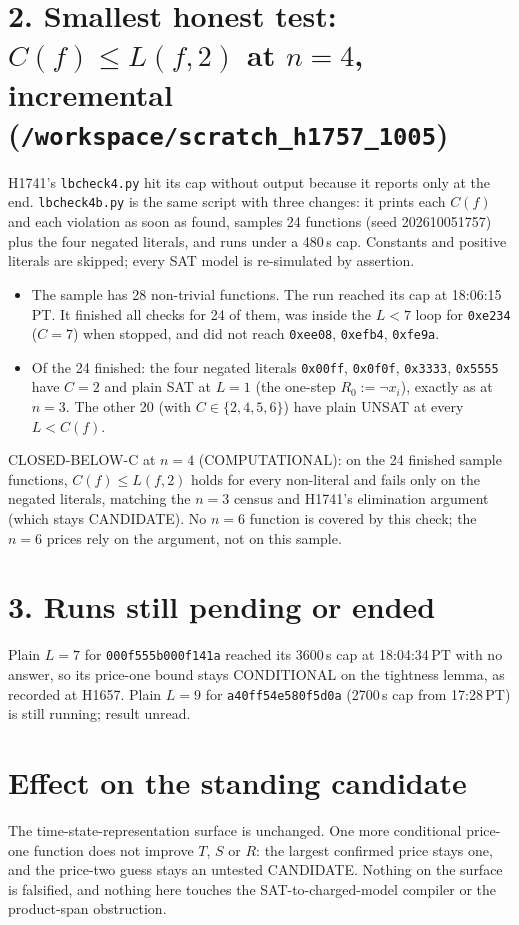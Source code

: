 \documentclass[11pt]{article}
\begin{document}
\section*{2. Smallest honest test: $C(f)\le L(f,2)$ at $n=4$, incremental (\texttt{/workspace/scratch\_h1757\_1005})}
H1741's \texttt{lbcheck4.py} hit its cap without output because it reports only at the end. \texttt{lbcheck4b.py} is the same script with three changes: it prints each $C(f)$ and each violation as soon as found, samples 24 functions (seed 202610051757) plus the four negated literals, and runs under a 480\,s cap. Constants and positive literals are skipped; every SAT model is re-simulated by assertion.
\begin{itemize}
\item The sample has 28 non-trivial functions. The run reached its cap at 18:06:15\,PT. It finished all checks for 24 of them, was inside the $L<7$ loop for \texttt{0xe234} ($C=7$) when stopped, and did not reach \texttt{0xee08}, \texttt{0xefb4}, \texttt{0xfe9a}.
\item Of the 24 finished: the four negated literals \texttt{0x00ff}, \texttt{0x0f0f}, \texttt{0x3333}, \texttt{0x5555} have $C=2$ and plain SAT at $L=1$ (the one-step $R_0:=\lnot x_i$), exactly as at $n=3$. The other 20 (with $C\in\{2,4,5,6\}$) have plain UNSAT at every $L<C(f)$.
\end{itemize}
CLOSED-BELOW-C at $n=4$ (COMPUTATIONAL): on the 24 finished sample functions, $C(f)\le L(f,2)$ holds for every non-literal and fails only on the negated literals, matching the $n=3$ census and H1741's elimination argument (which stays CANDIDATE). No $n=6$ function is covered by this check; the $n=6$ prices rely on the argument, not on this sample.

\section*{3. Runs still pending or ended}
Plain $L=7$ for \texttt{000f555b000f141a} reached its 3600\,s cap at 18:04:34\,PT with no answer, so its price-one bound stays CONDITIONAL on the tightness lemma, as recorded at H1657. Plain $L=9$ for \texttt{a40ff54e580f5d0a} (2700\,s cap from 17:28\,PT) is still running; result unread.

\section*{Effect on the standing candidate}
The time-state-representation surface is unchanged. One more conditional price-one function does not improve $T$, $S$ or $R$: the largest confirmed price stays one, and the price-two guess stays an untested CANDIDATE. Nothing on the surface is falsified, and nothing here touches the SAT-to-charged-model compiler or the product-span obstruction.
\end{document}
